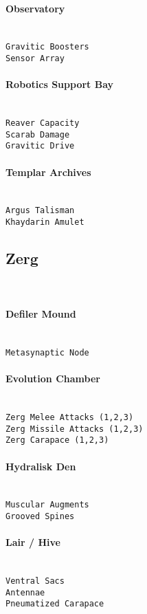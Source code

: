 \paragraph{Observatory} \mbox{}\\
\verb|Gravitic Boosters|\\
\verb|Sensor Array|

\paragraph{Robotics Support Bay} \mbox{}\\
\verb|Reaver Capacity|\\
\verb|Scarab Damage|\\
\verb|Gravitic Drive|

\paragraph{Templar Archives} \mbox{}\\
\verb|Argus Talisman|\\
\verb|Khaydarin Amulet|

\subsection{Zerg} \mbox{}\\

\paragraph{Defiler Mound} \mbox{}\\
\verb|Metasynaptic Node|

\paragraph{Evolution Chamber} \mbox{}\\
\verb|Zerg Melee Attacks (1,2,3)|\\
\verb|Zerg Missile Attacks (1,2,3)|\\
\verb|Zerg Carapace (1,2,3)|

\paragraph{Hydralisk Den} \mbox{}\\
\verb|Muscular Augments|\\
\verb|Grooved Spines|

\paragraph{Lair / Hive} \mbox{}\\
\verb|Ventral Sacs|\\
\verb|Antennae|\\
\verb|Pneumatized Carapace|

